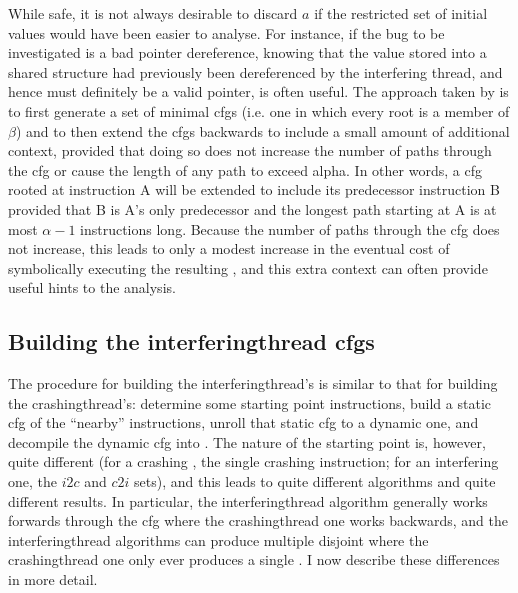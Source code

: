 While safe, it is not always desirable to discard $a$ if the
restricted set of initial values would have been easier to analyse.
For instance, if the bug to be investigated is a bad pointer
dereference, knowing that the value stored into a shared structure had
previously been dereferenced by the interfering thread, and hence must
definitely be a valid pointer, is often useful.  The approach taken by
{\implementation} is to first generate a set of minimal \glspl{cfg}
(i.e. one in which every root is a member of $\beta$) and to then
extend the \glspl{cfg} backwards to include a small amount of
additional context, provided that doing so does not increase the
number of paths through the \gls{cfg} or cause the length of any path
to exceed \gls{alpha}.  In other words, a \gls{cfg} rooted at
instruction A will be extended to include its predecessor instruction
B provided that B is A's only predecessor and the longest path
starting at A is at most $\alpha - 1$ instructions long.  Because the
number of paths through the \gls{cfg} does not increase, this leads to
only a modest increase in the eventual cost of symbolically executing
the resulting {\StateMachine}, and this extra context can often
provide useful hints to the analysis.

\subsection[Building the \glsentrytext{interferingthread} \glsentrytext{cfg}s]{Building the \gls{interferingthread} \glspl{cfg}}

The procedure for building the \gls{interferingthread}'s
{\StateMachines} is similar to that for building the
\gls{crashingthread}'s: determine some starting point instructions,
build a \gls{static cfg} of the ``nearby'' instructions, unroll that
\gls{static cfg} to a dynamic one, and decompile the \gls{dynamic cfg}
into {\AStateMachine}.  The nature of the starting point is, however,
quite different (for a crashing {\StateMachine}, the single crashing
instruction; for an interfering one, the $i2c$ and $c2i$ sets), and
this leads to quite different algorithms and quite different results.
In particular, the \gls{interferingthread} algorithm generally works
forwards through the \gls{cfg} where the \gls{crashingthread} one
works backwards, and the \gls{interferingthread} algorithms can
produce multiple disjoint {\StateMachines} where the
\gls{crashingthread} one only ever produces a single {\StateMachine}.
I now describe these differences in more detail.


